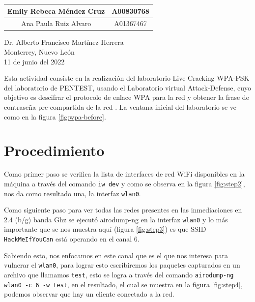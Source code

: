 \documentclass{article}
\begin{document}
\begin{titlepage}
\begin{center}
\begin{table}[h!]
\begin{tabular}{ ||c|c|| }
                    \hline
                    Emily Rebeca Méndez Cruz & A00830768 \\
                    \hline
                    Ana Paula Ruiz Alvaro & A01367467 \\
                    \hline
                \end{tabular}
            \end{table}
            \vspace{0.7cm}
            \large Dr. Alberto Francisco Martínez Herrera \\ %
            \vspace{0.2cm}
            \large Monterrey, Nuevo León \\
            \vspace{0.2cm}
            \large 11 de junio del 2022 \\
            \vspace{1cm}
        \end{center}
    \end{titlepage}
    
    
    Esta actividad consiste en la realización del laboratorio Live Cracking WPA-PSK del laboratorio de PENTEST, usando el Laboratorio virtual Attack-Defense, cuyo objetivo es descifrar el protocolo de enlace WPA para la red y obtener la frase de contraseña pre-compartida de la red \cite{farina}. La ventana inicial del laboratorio se ve como en la figura \ref{fig:wpa-before}.
    
    \section{Procedimiento}

        Como primer paso se verifica la lista de interfaces de red WiFi disponibles en la máquina a través del comando \texttt{iw dev} y como se observa en la figura \ref{fig:step2}, nos da como resultado una, la interfaz \texttt{wlan0}.
        
        Como siguiente paso para ver todas las redes presentes en las inmediaciones en 2.4 (b/g) banda Ghz se ejecutó airodump-ng en la interfaz \texttt{wlan0} y lo más importante que se nos muestra aquí (figura \ref{fig:step3}) es que SSID \texttt{HackMeIfYouCan} está operando en el canal 6. 
        
        Sabiendo esto, nos enfocamos en este canal que es el que nos interesa para vulnerar el \texttt{wlan0}, para lograr esto escribiremos los paquetes capturados en un archivo que llamamos \texttt{test}, esto se logra a través del comando \texttt{airodump-ng wlan0 -c 6 -w test}, en el resultado, el cual se muestra en la figura \ref{fig:step4}, podemos observar que hay un cliente conectado a la red.
        
\end{document}
